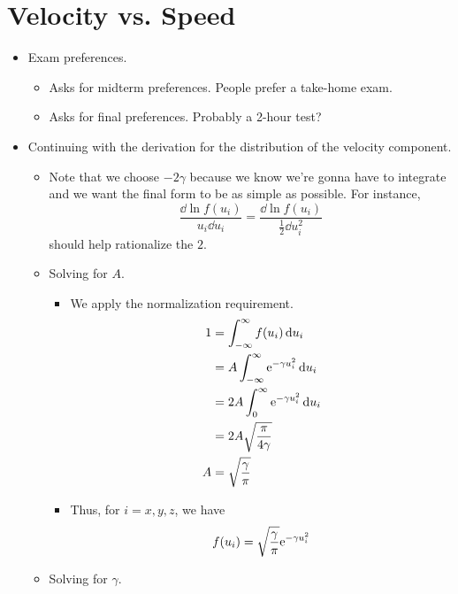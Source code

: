\documentclass[../notes.tex]{subfiles}
\begin{document}
\section{Velocity vs. Speed}
\begin{itemize}
    \item {}Exam preferences.
    \begin{itemize}
        \item Asks for midterm preferences. People prefer a take-home exam.
        \item Asks for final preferences. Probably a 2-hour test?
    \end{itemize}
    \item Continuing with the derivation for the distribution of the velocity component.
    \begin{itemize}
        \item Note that we choose $-2\gamma$ because we know we're gonna have to integrate and we want the final form to be as simple as possible. For instance,
        \begin{equation*}
            \frac{\dd{\ln f(u_i)}}{u_i\dd{u_i}} = \frac{\dd{\ln f(u_i)}}{\frac{1}{2}\dd{u_i^2}}
        \end{equation*}
        should help rationalize the $2$.
        \item Solving for $A$.
        \begin{itemize}
            \item We apply the normalization requirement.
            \begin{align*}
                1 &= \int_{-\infty}^\infty f(u_i)\dd{u_i}\\
                &= A\int_{-\infty}^\infty\e[-\gamma u_i^2]\dd{u_i}\\
                &= 2A\int_0^\infty\e[-\gamma u_i^2]\dd{u_i}\\
                &= 2A\sqrt{\frac{\pi}{4\gamma}}\\
                A &= \sqrt{\frac{\gamma}{\pi}}
            \end{align*}
            \item Thus, for $i=x,y,z$, we have
            \begin{equation*}
                f(u_i) = \sqrt{\frac{\gamma}{\pi}}\e[-\gamma u_i^2]
            \end{equation*}
        \end{itemize}
        \item Solving for $\gamma$.
        \begin{itemize}

\end{itemize}
\end{itemize}
\end{itemize}
\end{document}
